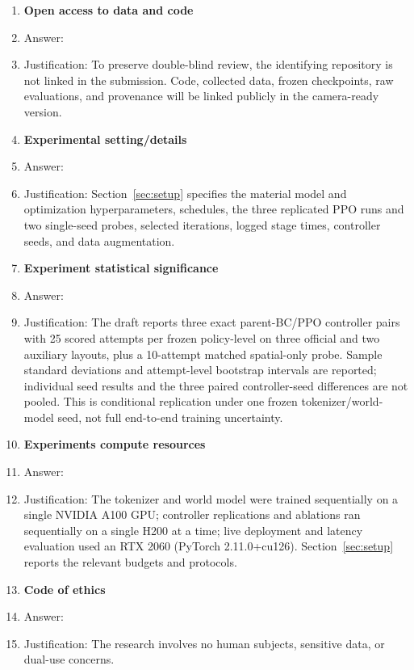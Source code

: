 \begin{enumerate}
\item {\bf Open access to data and code}
    \item[] Answer: \answerNo{}
    \item[] Justification: To preserve double-blind review, the identifying repository is not linked in the submission. Code, collected data, frozen checkpoints, raw evaluations, and provenance will be linked publicly in the camera-ready version.

\item {\bf Experimental setting/details}
    \item[] Answer: \answerYes{}
    \item[] Justification: Section~\ref{sec:setup} specifies the material model and optimization hyperparameters, schedules, the three replicated PPO runs and two single-seed probes, selected iterations, logged stage times, controller seeds, and data augmentation.

\item {\bf Experiment statistical significance}
    \item[] Answer: \answerYes{}
    \item[] Justification: The draft reports three exact parent-BC/PPO controller pairs with 25 scored attempts per frozen policy-level on three official and two auxiliary layouts, plus a 10-attempt matched spatial-only probe. Sample standard deviations and attempt-level bootstrap intervals are reported; individual seed results and the three paired controller-seed differences are not pooled. This is conditional replication under one frozen tokenizer/world-model seed, not full end-to-end training uncertainty.

\item {\bf Experiments compute resources}
    \item[] Answer: \answerYes{}
    \item[] Justification: The tokenizer and world model were trained sequentially on a single NVIDIA A100 GPU; controller replications and ablations ran sequentially on a single H200 at a time; live deployment and latency evaluation used an RTX 2060 (PyTorch 2.11.0+cu126). Section~\ref{sec:setup} reports the relevant budgets and protocols.

\item {\bf Code of ethics}
    \item[] Answer: \answerYes{}
    \item[] Justification: The research involves no human subjects, sensitive data, or dual-use concerns.


\end{enumerate}
